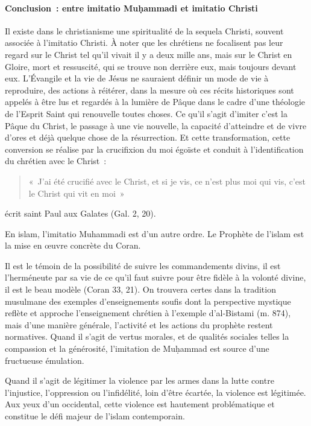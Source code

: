 \paragraph{Conclusion~: entre imitatio Muḥammadi et imitatio
Christi}

Il existe dans le christianisme une spiritualité de la {sequela
Christi}, souvent associée à l'imitatio Christi. À noter que les
chrétiens ne focalisent pas leur regard sur le Christ tel qu'il vivait
il y a deux mille ans, mais sur le Christ en Gloire, mort et ressuscité,
qui se trouve non derrière eux, mais toujours devant eux. L'Évangile et
la vie de Jésus ne sauraient définir un mode de vie à reproduire, des
actions à réitérer, dans la mesure où ces récits historiques sont
appelés à être lus et regardés à la lumière de Pâque dans le cadre d'une
théologie de l'Esprit Saint qui renouvelle toutes choses. Ce qu'il
s'agit d'imiter c'est la Pâque du Christ, le passage à une vie nouvelle,
la capacité d'atteindre et de vivre d'ores et déjà quelque chose de la
résurrection. Et cette transformation, cette conversion se réalise par
la crucifixion du moi égoïste et conduit à l'identification du chrétien
avec le Christ~:
\begin{quote}
    
«~J'ai été crucifié avec le Christ, et si je vis, ce
n'est plus moi qui vis, c'est le Christ qui vit en moi~» 
\end{quote} 
écrit saint
Paul aux Galates (Gal. 2, 20).

\begin{Synthesis}

En islam, l'imitatio Muhammadi est d'un autre ordre. Le Prophète de
l'islam est la mise en œuvre concrète du Coran.
\end{Synthesis}

Il est le témoin de la
possibilité de suivre les commandements divins, il est l'herméneute par
sa vie de ce qu'il faut suivre pour être fidèle à la volonté divine, il
est le beau modèle (Coran 33, 21). On trouvera certes dans la tradition
musulmane des exemples d'enseignements soufis dont la perspective
mystique reflète et approche l'enseignement chrétien à l'exemple
d'al-Bistami (m. 874), mais d'une manière générale, l'activité et les
actions du prophète restent normatives. Quand il s'agit de vertus
morales, et de qualités sociales telles la compassion et la générosité,
l'imitation de Muḥammad est source d'une fructueuse émulation.
\begin{Synthesis}

{Quand il s'agit de légitimer la violence par les armes dans la
lutte contre l'injustice, l'oppression ou l'infidélité, loin d'être
écartée, la violence est légitimée. Aux yeux d'un occidental, cette
violence est hautement problématique et constitue le défi majeur de
l'islam contemporain.}

\end{Synthesis}

